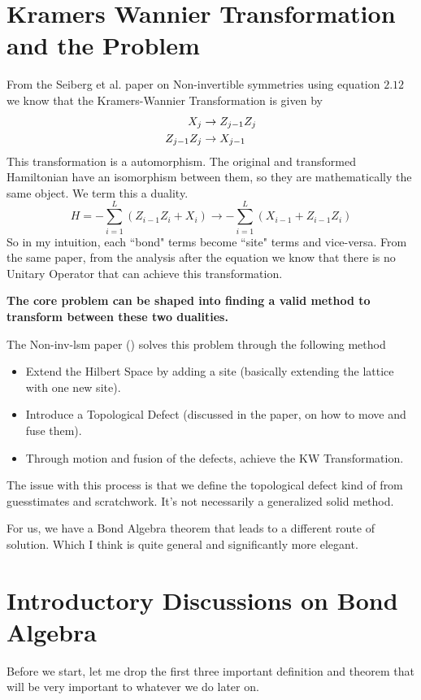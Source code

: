 \documentclass[12pt]{article}        %
\begin{document}
\section*{Kramers Wannier Transformation and the Problem} 
From the Seiberg et al. paper on Non-invertible symmetries \cite{lsm} using equation $2.12$ we know that the Kramers-Wannier Transformation is given by 
\begin{align} \label{kwtrans}
	X_j & \to Z_{j-1}Z_j \notag \\ 
	Z_{j-1} Z_j & \to  X_{j-1} 
\end{align}
This transformation is a automorphism. The original and transformed Hamiltonian have an isomorphism between them, so they are mathematically the same object. We term this a duality. 
\[
	H	 = - \sum_{i = 1}^{L} (Z_{i-1} Z_{i} + X_{i} ) \to - \sum_{i = 1}^{L} (X_{i-1} + Z_{i-1}Z_i ) 
\] 
So in my intuition, each ``bond" terms become ``site" terms and vice-versa. From the same paper, from the analysis after the equation we know that there is no Unitary Operator that can achieve this transformation.

\textbf{The core problem can be shaped into finding a valid method to transform between these two dualities.}

The Non-inv-lsm paper (\cite{lsm}) solves this problem through the following method
\begin{itemize}
	\item Extend the Hilbert Space by adding a site (basically extending the lattice with one new site).
	\item Introduce a Topological Defect (discussed in the paper, on how to move and fuse them).
	\item Through motion and fusion of the defects, achieve the KW Transformation. 
\end{itemize}

The issue with this process is that we define the topological defect kind of from guesstimates and scratchwork. It's not necessarily a generalized solid method.

For us, we have a Bond Algebra theorem that leads to a different route of solution. Which I think is quite general and significantly more elegant.  


\section*{Introductory Discussions on Bond Algebra}
Before we start, let me drop the first three important definition and theorem that will be very important to whatever we do later on. 
\end{document}
